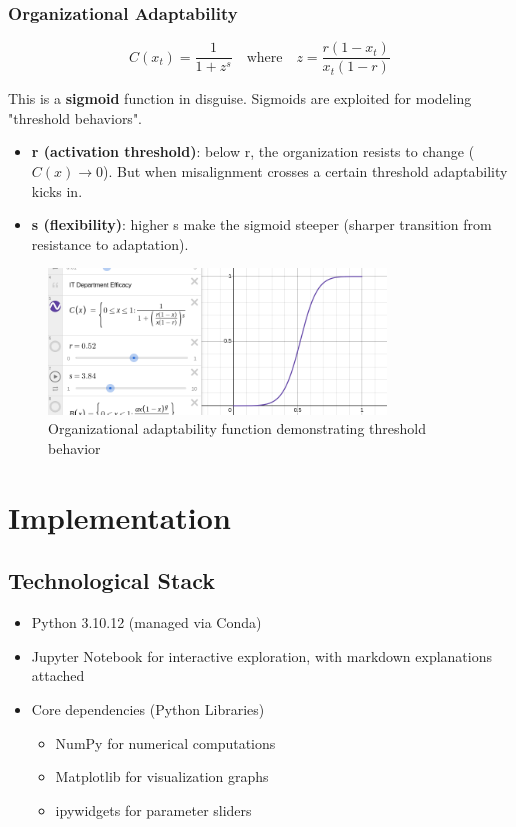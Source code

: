 \documentclass[a4paper, 10pt]{article}
\begin{document}
\subsubsection{Organizational Adaptability}
\begin{equation}
	C(x_t) = \frac{1}{1 + z^s} \quad \text{where} \quad z = \frac{r (1 - x_t)}{x_t (1 - r)}
\end{equation}

This is a \textbf{sigmoid} function in disguise. Sigmoids are exploited for modeling "threshold behaviors".

\begin{itemize}
	\item \textbf{r (activation threshold)}: below r, the organization resists to change ($C(x) \rightarrow 0$). But when misalignment crosses a certain threshold adaptability kicks in.
	\item \textbf{s (flexibility)}: higher s make the sigmoid steeper (sharper transition from resistance to adaptation).
\end{itemize}

\begin{figure}[h]
	\centering
	\includegraphics[width=0.8\textwidth]{../images/desmos/C(x)-desmos.png}
	\caption{Organizational adaptability function demonstrating threshold behavior}
\end{figure}


\section{Implementation}
\subsection{Technological Stack}
\begin{itemize}
	\item Python 3.10.12 (managed via Conda)
	\item Jupyter Notebook for interactive exploration, with markdown explanations attached
	\item Core dependencies (Python Libraries)
	      \begin{itemize}
		      \item NumPy for numerical computations
		      \item Matplotlib for visualization graphs
		      \item ipywidgets for parameter sliders
	      \end{itemize}
\end{itemize}
\end{document}
